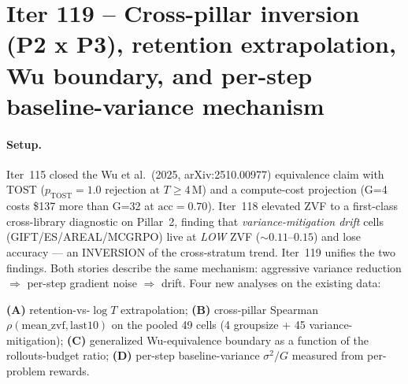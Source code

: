 \section{Iter 119 -- Cross-pillar inversion (P2 x P3), retention
extrapolation, Wu boundary, and per-step baseline-variance mechanism}
\label{sec:group-size-iter119}

\paragraph{Setup.}
Iter~115 closed the Wu et al.\ (2025, arXiv:2510.00977) equivalence
claim with TOST ($p_{\text{TOST}}{=}1.0$ rejection at $T{\ge}4\,$M) and
a compute-cost projection (G=4 costs \$137 more than G=32 at
$\mathrm{acc}{=}0.70$). Iter~118 elevated ZVF to a first-class
cross-library diagnostic on Pillar~2, finding that
\emph{variance-mitigation drift} cells (GIFT/ES/AREAL/MCGRPO) live at
\emph{LOW} ZVF ($\sim 0.11$--$0.15$) and lose accuracy --- an
INVERSION of the cross-stratum trend. Iter~119 unifies the two
findings. Both stories describe the same mechanism: aggressive
variance reduction $\Rightarrow$ per-step gradient noise $\Rightarrow$
drift. Four new analyses on the existing data:

\textbf{(A)} retention-vs-$\log T$ extrapolation; \textbf{(B)}
cross-pillar Spearman $\rho(\mathrm{mean\_zvf}, \mathrm{last10})$ on
the pooled 49 cells (4 groupsize + 45 variance-mitigation);
\textbf{(C)} generalized Wu-equivalence boundary as a function of
the rollouts-budget ratio; \textbf{(D)} per-step baseline-variance
$\sigma^2/G$ measured from per-problem rewards.

